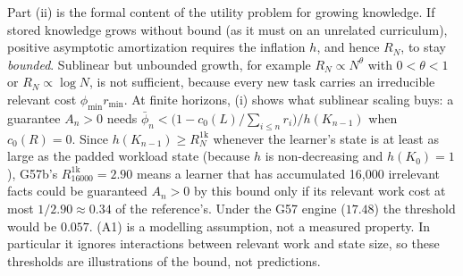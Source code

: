 \documentclass[11pt]{article}
\theoremstyle{remark}
\begin{document}
Part (ii) is the formal content of the utility problem for growing knowledge. If stored knowledge grows without bound (as it must on an unrelated curriculum), positive asymptotic amortization requires the inflation $h$, and hence $R_N$, to stay \emph{bounded}. Sublinear but unbounded growth, for example $R_N\propto N^{\theta}$ with $0<\theta<1$ or $R_N\propto\log N$, is not sufficient, because every new task carries an irreducible relevant cost $\phi_{\min}r_{\min}$. At finite horizons, (i) shows what sublinear scaling buys: a guarantee $A_n>0$ needs $\bar\phi_n<\bigl(1-c_0(L)/\textstyle\sum_{i\le n}r_i\bigr)/h(K_{n-1})$ when $c_0(R)=0$. Since $h(K_{n-1})\ge R^{1\mathrm{k}}_{N}$ whenever the learner's state is at least as large as the padded workload state (because $h$ is non-decreasing and $h(K_0)=1$), G57b's $R^{1\mathrm{k}}_{16000}=2.90$ means a learner that has accumulated 16{,}000 irrelevant facts could be guaranteed $A_n>0$ by this bound only if its relevant work cost at most $1/2.90\approx0.34$ of the reference's. Under the G57 engine ($17.48$) the threshold would be $0.057$. (A1) is a modelling assumption, not a measured property. In particular it ignores interactions between relevant work and state size, so these thresholds are illustrations of the bound, not predictions.
\end{document}
